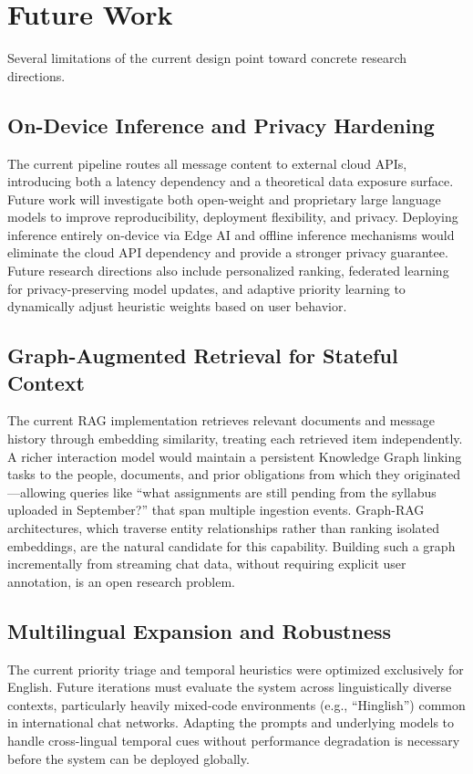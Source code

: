\section{Future Work}
\label{sec:future_work}

Several limitations of the current design point toward concrete research directions.

\subsection{On-Device Inference and Privacy Hardening}
The current pipeline routes all message content to external cloud APIs, introducing both a latency dependency and a theoretical data exposure surface. Future work will investigate both open-weight and proprietary large language models to improve reproducibility, deployment flexibility, and privacy. Deploying inference entirely on-device via Edge AI and offline inference mechanisms would eliminate the cloud API dependency and provide a stronger privacy guarantee. Future research directions also include personalized ranking, federated learning for privacy-preserving model updates, and adaptive priority learning to dynamically adjust heuristic weights based on user behavior.

\subsection{Graph-Augmented Retrieval for Stateful Context}
The current RAG implementation retrieves relevant documents and message history through embedding similarity, treating each retrieved item independently. A richer interaction model would maintain a persistent Knowledge Graph linking tasks to the people, documents, and prior obligations from which they originated—allowing queries like ``what assignments are still pending from the syllabus uploaded in September?'' that span multiple ingestion events. Graph-RAG architectures, which traverse entity relationships rather than ranking isolated embeddings, are the natural candidate for this capability. Building such a graph incrementally from streaming chat data, without requiring explicit user annotation, is an open research problem.

\subsection{Multilingual Expansion and Robustness}
The current priority triage and temporal heuristics were optimized exclusively for English. Future iterations must evaluate the system across linguistically diverse contexts, particularly heavily mixed-code environments (e.g., ``Hinglish'') common in international chat networks. Adapting the prompts and underlying models to handle cross-lingual temporal cues without performance degradation is necessary before the system can be deployed globally.
